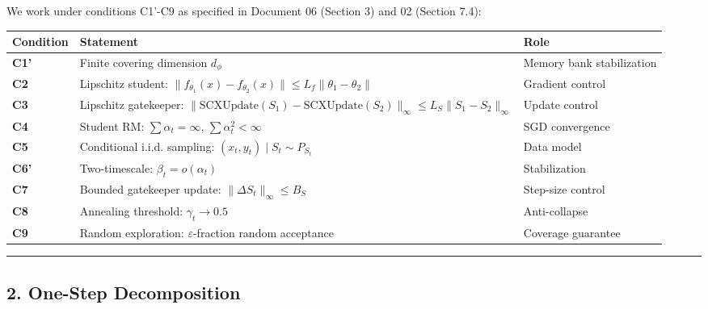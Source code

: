 \documentclass[
  12pt,
]{article}
\begin{document}
We work under conditions C1'-C9 as specified in Document 06 (Section 3)
and 02 (Section 7.4):

\begin{longtable}[]{@{}
  >{\raggedright\arraybackslash}p{}
  >{\raggedright\arraybackslash}p{}
  >{\raggedright\arraybackslash}p{}@{}}
\toprule\noalign{}
\begin{minipage}[b]{\linewidth}\raggedright
Condition
\end{minipage} & \begin{minipage}[b]{\linewidth}\raggedright
Statement
\end{minipage} & \begin{minipage}[b]{\linewidth}\raggedright
Role
\end{minipage} \\
\midrule\noalign{}
\endhead
\bottomrule\noalign{}
\endlastfoot
\textbf{C1'} & Finite covering dimension \(d_\phi\) & Memory bank
stabilization \\
\textbf{C2} & Lipschitz student:
\(\|f_{\theta_1}(x) - f_{\theta_2}(x)\| \leq L_f \|\theta_1 - \theta_2\|\)
& Gradient control \\
\textbf{C3} & Lipschitz gatekeeper:
\(\|\text{SCXUpdate}(S_1) - \text{SCXUpdate}(S_2)\|_\infty \leq L_S \|S_1 - S_2\|_\infty\)
& Update control \\
\textbf{C4} & Student RM: \(\sum \alpha_t = \infty\),
\(\sum \alpha_t^2 < \infty\) & SGD convergence \\
\textbf{C5} & Conditional i.i.d. sampling:
\((x_t, y_t) \mid S_t \sim P_{S_t}\) & Data model \\
\textbf{C6'} & Two-timescale: \(\beta_t = o(\alpha_t)\) &
Stabilization \\
\textbf{C7} & Bounded gatekeeper update:
\(\|\Delta S_t\|_\infty \leq B_S\) & Step-size control \\
\textbf{C8} & Annealing threshold: \(\gamma_t \to 0.5\) &
Anti-collapse \\
\textbf{C9} & Random exploration: \(\varepsilon\)-fraction random
acceptance & Coverage guarantee \\
\end{longtable}

\begin{center}\rule{0.5\linewidth}{0.5pt}\end{center}

\subsection{2. One-Step Decomposition}\label{one-step-decomposition}
\end{document}
